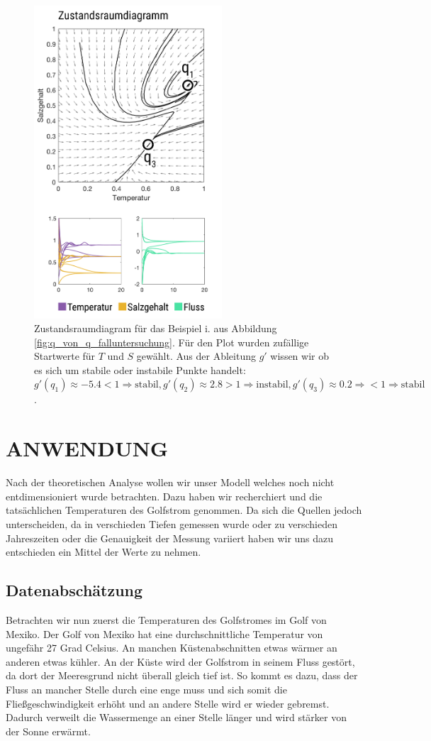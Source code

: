 \documentclass[a4paper,twoside]{article}
\begin{document}
	\begin{figure}[!h]
  		\centering
 		\includegraphics[width=7cm]{../Diagramme/zustandsdiagram.png}
  		\caption{Zustandsraumdiagram für das Beispiel i. aus Abbildung \ref{fig:q_von_q_falluntersuchung}. Für den Plot wurden zufällige Startwerte für \(T\) und \(S\) gewählt. Aus der Ableitung \(g'\) wissen wir ob es sich um stabile oder instabile Punkte handelt: \(g'(q_1) \approx -5.4 < 1 \Rightarrow \textrm{stabil}, g'(q_2) \approx 2.8 > 1 \Rightarrow \textrm{instabil}, g'(q_3) \approx 0.2 \Rightarrow < 1 \Rightarrow \textrm{stabil} \). }
  		\label{fig:Zustandsraumdiagram}
	\end{figure}	
	
	\section{\uppercase{Anwendung}}\label{sec:Anwendung}
	\noindent Nach der theoretischen Analyse wollen wir unser Modell welches noch nicht entdimensioniert wurde betrachten. Dazu haben wir recherchiert und die tatsächlichen Temperaturen des Golfstrom genommen. Da sich die Quellen jedoch unterscheiden, da in verschieden Tiefen gemessen wurde oder zu verschieden Jahreszeiten oder die Genauigkeit der Messung variiert haben wir uns dazu entschieden ein Mittel der Werte zu nehmen.
	
	\subsection{Datenabschätzung} \label{Datenabschaetzung}
	\noindent Betrachten wir nun zuerst die Temperaturen des Golfstromes im Golf von Mexiko. Der Golf von Mexiko hat eine durchschnittliche Temperatur von ungefähr 27 Grad Celsius. An manchen Küstenabschnitten etwas wärmer an anderen etwas kühler. An der Küste wird der Golfstrom in seinem Fluss gestört, da dort der Meeresgrund nicht überall gleich tief ist. So kommt es dazu, dass der Fluss an mancher Stelle durch eine enge muss und sich somit die Fließgeschwindigkeit erhöht und an andere Stelle wird er wieder gebremst. Dadurch verweilt die Wassermenge an einer Stelle länger und wird stärker von der Sonne erwärmt. 
	
\end{document}
